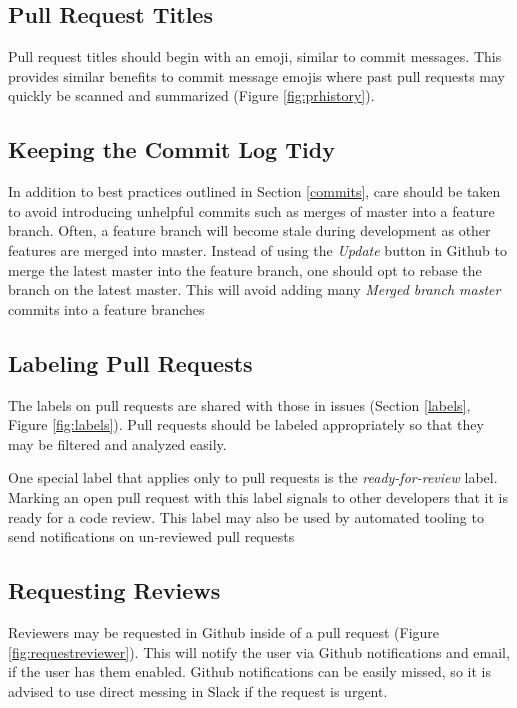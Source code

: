 \documentclass[a4paper,12pt,titlepage]{scrartcl}
\begin{document}
	\subsection{Pull Request Titles}
	
	Pull request titles should begin with an emoji, similar to commit messages.
	This provides similar benefits to commit message emojis where past pull requests may quickly be scanned and summarized (Figure \ref{fig:prhistory}).
	
	\subsection{Keeping the Commit Log Tidy}
	
	In addition to best practices outlined in Section \ref{commits}, care should be taken to avoid introducing unhelpful commits such as merges of master into a feature branch.
	Often, a feature branch will become stale during development as other features are merged into master.
	Instead of using the {\em Update} button in Github to merge the latest master into the feature branch, one should opt to rebase the branch on the latest master.
	This will avoid adding many {\em Merged branch master} commits into a feature branches 
	
	\subsection{Labeling Pull Requests}
	
	The labels on pull requests are shared with those in issues (Section \ref{labels}, Figure \ref{fig:labels}).
	Pull requests should be labeled appropriately so that they may be filtered and analyzed easily.
	
	One special label that applies only to pull requests is the {\em ready-for-review} label.
	Marking an open pull request with this label signals to other developers that it is ready for a code review.
	This label may also be used by automated tooling to send notifications on un-reviewed pull requests
	
	\subsection{Requesting Reviews}

   	
   	Reviewers may be requested in Github inside of a pull request (Figure \ref{fig:requestreviewer}).
   	This will notify the user via Github notifications and email, if the user has them enabled.
   	Github notifications can be easily missed, so it is advised to use direct messing in Slack if the request is urgent.
   	
\end{document}
